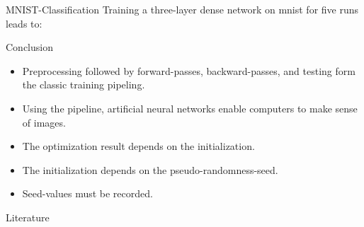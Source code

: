 \documentclass[notes]{beamer}
\begin{document}
    \begin{frame}{MNIST-Classification}
      Training a three-layer dense network on mnist for five runs leads to:
      \begin{figure}
        
      \end{figure}
    \end{frame}

    \begin{frame}{Conclusion}
      \begin{itemize}
        \item Preprocessing followed by forward-passes, backward-passes, and testing form the classic training pipeling.
        \item Using the pipeline, artificial neural networks enable computers to make sense of images.
        \item The optimization result depends on the initialization.
        \item The initialization depends on the pseudo-randomness-seed.
        \item Seed-values must be recorded.
      \end{itemize}
    \end{frame}

    \begin{frame}[allowframebreaks]{Literature}
      \printbibliography
    \end{frame}
\end{document}
